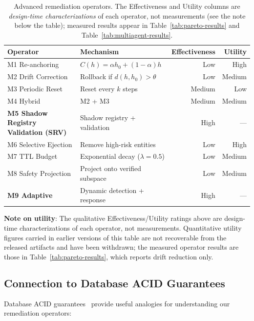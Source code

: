 \documentclass{article}
\theoremstyle{plain}
\theoremstyle{definition}
\begin{document}
\begin{table}[!htbp]
\centering
\caption{Advanced remediation operators. The Effectiveness and Utility columns are \emph{design-time characterizations} of each operator, not measurements (see the note below the table); measured results appear in Table~\ref{tab:pareto-results} and Table~\ref{tab:multiagent-results}.}
\small
\begin{tabular}{llrr}
\toprule
\textbf{Operator} & \textbf{Mechanism} & \textbf{Effectiveness} & \textbf{Utility} \\
\midrule
M1 Re-anchoring & $C(h) = \alpha h_0 + (1-\alpha)h$ & Low & High \\
M2 Drift Correction & Rollback if $d(h, h_0) > \theta$ & Low & Medium \\
M3 Periodic Reset & Reset every $k$ steps & Medium & Low \\
M4 Hybrid & M2 + M3 & Medium & Medium \\
\textbf{M5 Shadow Registry Validation (SRV)} & Shadow registry + validation & High & --- \\
M6 Selective Ejection & Remove high-risk entities & Low & High \\
M7 TTL Budget & Exponential decay ($\lambda=0.5$) & Low & Medium \\
M8 Safety Projection & Project onto verified subspace & Low & Medium \\
\textbf{M9 Adaptive} & Dynamic detection + response & High & --- \\
\bottomrule
\end{tabular}
\end{table}

\textbf{Note on utility}: The qualitative Effectiveness/Utility ratings above are design-time characterizations of each operator, not measurements. Quantitative utility figures carried in earlier versions of this table are not recoverable from the released artifacts and have been withdrawn; the measured operator results are those in Table~\ref{tab:pareto-results}, which reports drift reduction only.

\subsection{Connection to Database ACID Guarantees}

Database ACID guarantees~\cite{gray1981transaction} provide useful analogies for understanding our remediation operators:
\end{document}
